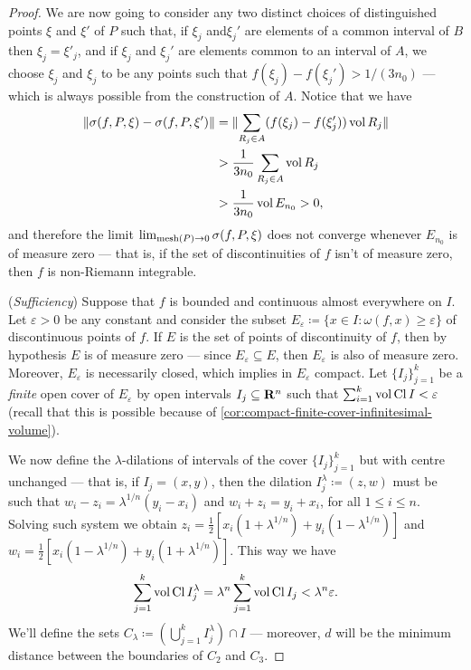 \begin{proof}
    We are now going to consider any two distinct choices of distinguished points
    \(\xi\) and \(\xi'\) of \(P\) such that, if \(\xi_j\) and\(\xi_j'\) are elements
    of a common interval of \(B\) then \(\xi_j = \xi'_j\), and if \(\xi_j\) and
    \(\xi_j'\) are elements common to an interval of \(A\), we choose \(\xi_j\) and
    \(\xi_j\) to be any points such that \(f(\xi_j) - f(\xi_j') > 1/(3n_0)\) ---
    which is always possible from the construction of \(A\). Notice that we have
    \begin{align*}
        \lVert\sigma(f, P, \xi) - \sigma(f, P, \xi')\rVert
         & = \lVert\sum_{R_{j} \in A} (f(\xi_j) - f(\xi_j')) \operatorname{vol} R_j\rVert \\
         & > \frac 1 {3 n_0} \sum_{R_j \in A} \operatorname{vol} R_j                 \\
         & > \frac 1 {3 n_0} \operatorname{vol} E_{n_0} > 0,
    \end{align*}
    and therefore the limit \(\lim_{\operatorname{mesh}(P) \to 0} \sigma(f, P, \xi)\) does not
    converge whenever \(E_{n_0}\) is of measure zero --- that is, if the set of
    discontinuities of \(f\) isn't of measure zero, then \(f\) is non-Riemann
    integrable.

    (\emph{Sufficiency}) Suppose that \(f\) is bounded and continuous almost
    everywhere on \(I\). Let \(\varepsilon > 0\) be any constant and consider the
    subset \(E_{\varepsilon} \coloneq \{x \in I \colon \omega(f, x) \geq \varepsilon\}\)
    of discontinuous points of \(f\). If \(E\) is the set of points of discontinuity
    of \(f\), then by hypothesis \(E\) is of measure zero --- since
    \(E_{\varepsilon} \subseteq E\), then \(E_{\varepsilon}\) is also of measure
    zero. Moreover, \(E_{\varepsilon}\) is necessarily closed, which implies in
    \(E_{\varepsilon}\) compact. Let \(\{I_{j}\}_{j=1}^k\) be a \emph{finite} open
    cover of \(E_{\varepsilon}\) by open intervals \(I_j \subseteq \mathbf{R}^n\) such that
    \(\sum_{i=1}^k \operatorname{vol} \operatorname{Cl} I < \varepsilon\) (recall that this is possible
    because of \cref{cor:compact-finite-cover-infinitesimal-volume}).

    We now define the \(\lambda\)-dilations of intervals of the cover
    \(\{I_{j}\}_{j=1}^k\) but with centre unchanged --- that is, if \(I_j = (x,
    y)\), then the dilation \(I_{j}^{\lambda} \coloneq (z, w)\) must be such that
    \(w_i - z_i = \lambda^{1/n} (y_i - x_i)\) and \(w_i + z_i = y_i + x_i\), for all
    \(1 \leq i \leq n\). Solving such system we obtain \(z_i = \frac 1 2 [x_i(1 +
            \lambda^{1/n}) + y_i(1 - \lambda^{1/n})]\) and \(w_i = \frac 1 2 [x_i(1 -
            \lambda^{1/n}) + y_i(1 + \lambda^{1/n})]\). This way we have
    \[
        \sum_{j=1}^k \operatorname{vol} \operatorname{Cl} I_j^{\lambda}
        = \lambda^n \sum_{j=1}^k \operatorname{vol} \operatorname{Cl} I_j
        < \lambda^n \varepsilon.
    \]
    We'll define the sets \(C_{\lambda} \coloneq (\bigcup_{j=1}^k I_j^{\lambda})
    \cap I\) --- moreover, \(d\) will be the minimum distance between the boundaries
    of \(C_2\) and \(C_3\).


\end{proof}
